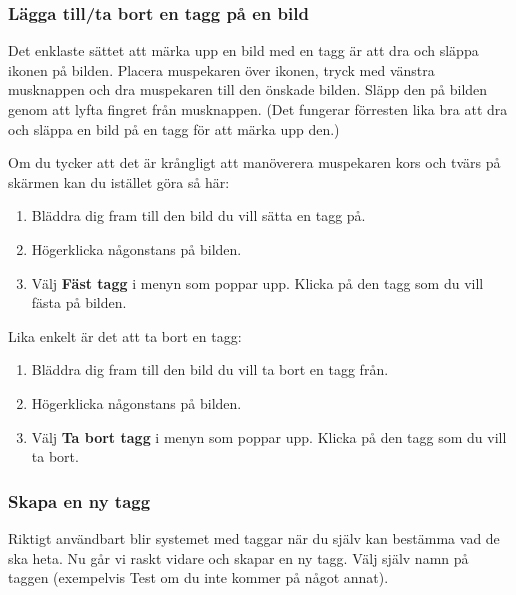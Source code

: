 \documentclass[a4paper,final]{memoir} %
\begin{document}
\subsubsection{Lägga till/ta bort en tagg på en bild}

Det enklaste sättet att märka upp en bild med en tagg är att dra och släppa ikonen på bilden. Placera muspekaren över ikonen, tryck med vänstra musknappen och dra muspekaren till den önskade bilden. Släpp den på bilden genom att lyfta fingret från musknappen. (Det fungerar förresten lika bra att dra och släppa en bild på en tagg för att märka upp den.)

Om du tycker att det är krångligt att manöverera muspekaren kors och tvärs på skärmen kan du istället göra så här:

\begin{enumerate}

\item Bläddra dig fram till den bild du vill sätta en tagg på.

\item Högerklicka någonstans på bilden.

\item Välj \textbf{Fäst tagg} i menyn som poppar upp. Klicka på den tagg som du vill fästa på bilden.

\end{enumerate}

Lika enkelt är det att ta bort en tagg:

\begin{enumerate}

\item Bläddra dig fram till den bild du vill ta bort en tagg från.

\item Högerklicka någonstans på bilden.

\item Välj \textbf{Ta bort tagg} i menyn som poppar upp. Klicka på den tagg som du vill ta bort.

\end{enumerate}

\subsubsection{Skapa en ny tagg}

Riktigt användbart blir systemet med taggar när du själv kan bestämma vad de ska heta. Nu går vi raskt vidare och skapar en ny tagg. Välj själv namn på taggen (exempelvis Test om du inte kommer på något annat).
\end{document}
